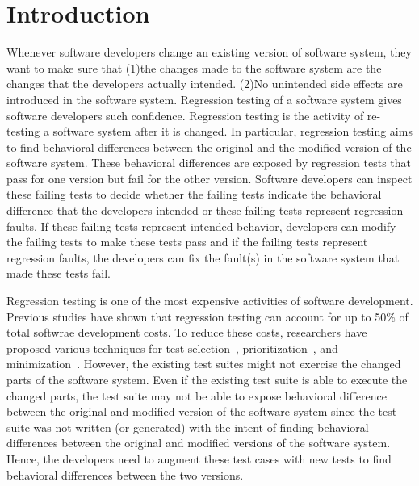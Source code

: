 \section{Introduction}

Whenever software developers change an existing version of software system, they want to make sure that (1)the changes made to the software system are the changes that the developers actually intended. (2)No unintended side effects are introduced in the software system. Regression testing of a software system gives software developers such confidence. Regression testing is the activity of re-testing a software system after it is changed. In particular, regression testing aims to find behavioral differences between the original and the modified version of the software system. These behavioral differences are exposed by regression tests that pass for one version but fail for the other version. Software developers can inspect these failing tests to decide whether the failing tests indicate the behavioral difference that the developers intended or these failing tests represent regression faults. If these failing tests represent intended behavior, developers can modify the failing tests to make these tests pass and if the failing tests represent regression faults, the developers can fix the fault(s) in the software system that made these tests fail.
 
Regression testing is one of the most expensive activities of software development. Previous studies have shown that  regression testing can account for up to 50\% of total softwrae development costs. To reduce these costs, researchers have proposed various techniques for test selection~\cite{minimization}, prioritization~\cite{prioritization}, and minimization~\cite{minimization}. However, the existing test suites might not exercise the changed parts of the software system. Even if the existing test suite is able to execute the changed parts, the test suite may not be able to expose behavioral difference between the original and modified version of the software system since the test suite was not written (or generated) with the intent of finding behavioral differences between the original and modified versions of the software system. Hence, the developers need to augment these test cases with new tests to find behavioral differences between the two versions.

